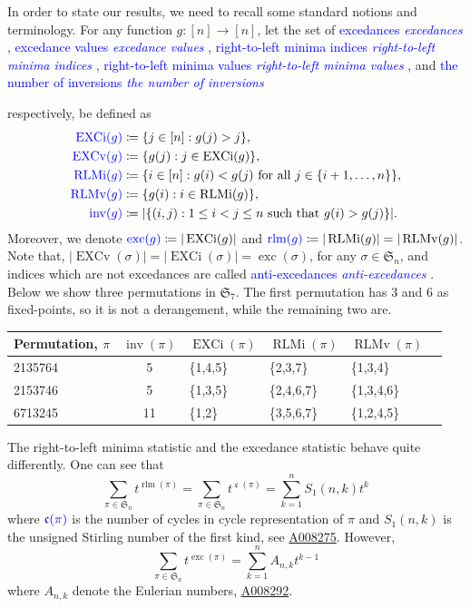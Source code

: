\documentclass[reqno]{amsart}
\theoremstyle{definition}
\newcommand{\stirlingOne}[2]{{S_1(#1,#2)}}
\newcommand{\defin}[1]{%
\relax\ifmmode%
\textcolor{blue}{#1}%
\else\textcolor{blue}{\emph{#1}}%
\fi%
}
\newcommand{\oeis}[1]{\href{http://oeis.org/#1}{#1}}
\newcommand{\symS}{\mathfrak{S}}
\DeclareMathOperator{\inv}{inv}
\DeclareMathOperator{\cycle}{\mathfrak{c}}
\DeclareMathOperator{\exc}{exc}
\DeclareMathOperator{\EXCi}{EXCi}
\DeclareMathOperator{\EXCv}{EXCv}
\DeclareMathOperator{\rlm}{rlm}
\DeclareMathOperator{\RLMv}{RLMv}
\DeclareMathOperator{\RLMi}{RLMi}
\begin{document}
%
In order to state our results, we need to 
recall some standard notions and terminology.
For any function $g:[n]\longrightarrow [n]$, let 
the set of \defin{excedances}, \defin{excedance values},
\defin{right-to-left minima indices}, \defin{right-to-left minima values}, and \defin{the number of inversions}
respectively, be defined as 
\begin{align*}
\defin{\EXCi(g)} &\coloneqq \{ j \in [n] : g(j)>j \}, \\
\defin{\EXCv(g)} &\coloneqq \{ g(j) : j \in \EXCi(g) \}, \\
\defin{\RLMi(g)} &\coloneqq  \{i\in [n]: g(i)<g(j) \text{ for all } j\in \{i+1,\dotsc,n\} \},\\
\defin{\RLMv(g)}  &\coloneqq  \{ g(i) : i \in \RLMi(g)\}, \\
\defin{\inv(g)} &\coloneqq |\{ (i,j) : 1\leq i < j \leq n \text{ such that } g(i)>g(j) \}|.
\end{align*}
Moreover, we denote $\defin{\exc(g)} \coloneqq |\EXCi(g)|$ and $\defin{\rlm(g)} \coloneqq |\RLMi(g)| = |\RLMv(g)|$. Note that,  $|\EXCv(\sigma)|=|\EXCi(\sigma)|=\exc(\sigma)$, for any $\sigma\in \symS_n$, and indices which are not excedances are called \defin{anti-excedances}. Below we show three permutations in $\symS_7$.
The first permutation has $3$ and $6$ as 
fixed-points, so it is not a derangement,
while the remaining two are.
\begin{center}
	\begin{tabular}{l c llll}
		Permutation, $\pi$ & $\inv(\pi)$ & $\EXCi(\pi)$ &  $\RLMi(\pi)$ & $\RLMv(\pi)$  \\
		\midrule 
		2135764 & 5 & \{1,4,5\} & \{2,3,7\} & \{1,3,4\}  \\
		2153746 & 5 & \{1,3,5\} & \{2,4,6,7\} & \{1,3,4,6\}  \\
		6713245 & 11 & \{1,2\} & \{3,5,6,7\} & \{1,2,4,5\} 
	\end{tabular}
\end{center}

The right-to-left minima statistic and the excedance statistic 
behave quite differently. One can see that
\[
\sum_{\pi \in \symS_n} t^{\rlm(\pi)} = 
\sum_{\pi \in \symS_n} t^{\cycle(\pi)} =
\sum_{k=1}^n \stirlingOne{n}{k} t^k 
\]
where $\defin{\cycle(\pi)}$ is the number of cycles in cycle representation of $\pi$ 
and $\stirlingOne{n}{k}$ is the unsigned Stirling number of the first kind,
see \oeis{A008275}.
%
However,
\[
\sum_{\pi \in \symS_n} t^{\exc(\pi)} = 
\sum_{k=1}^{n} A_{n,k} t^{k-1} 
\]
where $A_{n,k}$ denote the Eulerian numbers, \oeis{A008292}.
\end{document}
